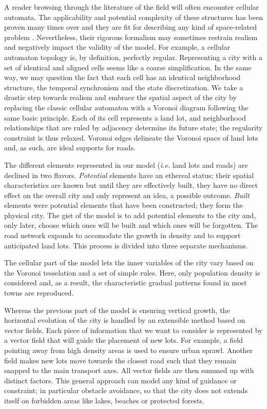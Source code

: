 \documentclass[12pt]{article}
\begin{document}
A reader browsing through the literature of the field will often
encounter cellular automata. The applicability and potential
complexity of these structures has been proven many times over and
they are fit for describing any kind of space-related problem
\cite{Edwards1993}. Nevertheless, their rigorous formalism may
sometimes restrain realism and negatively impact the validity of the
model. For example, a cellular automaton topology is, by definition,
perfectly regular. Representing a city with a set of identical and
aligned cells seems like a coarse simplification. In the same way, we
may question the fact that each cell has an identical neighborhood
structure, the temporal synchronism and the state discretization. We
take a drastic step towards realism and embrace the spatial aspect of
the city by replacing the classic cellular automaton with a Voronoi
diagram following the same basic principle. Each of its cell
represents a land lot, and neighborhood relationships that are ruled
by adjacency determine its future state; the regularity constraint is
thus relaxed. Voronoi edges delineate the Voronoi space of land lots
and, as such, are ideal supports for roads.

The different elements represented in our model (\textit{i.e.} land
lots and roads) are declined in two flavors. \textit{Potential}
elements have an ethereal status; their spatial characteristics are
known but until they are effectively built, they have no direct effect
on the overall city and only represent an idea, a possible
outcome. \textit{Built} elements were potential elements that have
been constructed; they form the physical city. The gist of the model
is to add potential elements to the city and, only later, choose which
ones will be built and which ones will be forgotten. The road network
expands to accomodate the growth in density and to support anticipated
land lots. This process is divided into three separate mechanisms.

The cellular part of the model lets the inner variables of the city
vary based on the Voronoi tesselation and a set of simple rules. Here,
only population density is considered and, as a result, the
characteristic gradual patterns found in most towns are reproduced.

Whereas the previous part of the model is ensuring vertical growth,
the horizontal evolution of the city is handled by an extensible
method based on vector fields. Each piece of information that we want
to consider is represented by a vector field that will guide the
placement of new lots. For example, a field pointing away from high
density areas is used to ensure urban sprawl. Another field makes new
lots move towards the closest road such that they remain snapped to
the main transport axes. All vector fields are then summed up with
distinct factors. This general approach can model any kind of guidance
or constraint; in particular obstacle avoidance, so that the city
does not extends itself on forbidden areas like lakes, beaches or
protected forests.
\end{document}
